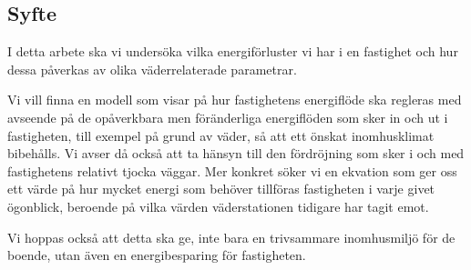 \subsection{Syfte}
I detta arbete ska vi undersöka vilka energiförluster vi har i en fastighet och hur dessa påverkas av olika väderrelaterade parametrar.

Vi vill finna en modell som visar på hur fastighetens energiflöde ska regleras med avseende på de opåverkbara men föränderliga energiflöden som sker in och ut i fastigheten, till exempel på grund av väder, så att ett önskat inomhusklimat bibehålls. Vi avser då också att ta hänsyn till den fördröjning som sker i och med fastighetens relativt tjocka väggar. Mer konkret söker vi en ekvation som ger oss ett värde på hur mycket energi som behöver tillföras fastigheten i varje givet ögonblick, beroende på vilka värden väderstationen tidigare har tagit emot.

Vi hoppas också att detta ska ge, inte bara en trivsammare inomhusmiljö för de boende, utan även en energibesparing för fastigheten.